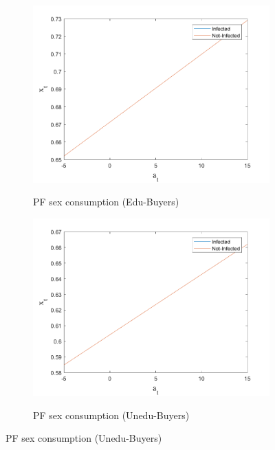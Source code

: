 \begin{figure}[H]\caption{Pre-epidemic stage, continuation}
\begin{subfigure}{0.5\textwidth}\caption{PF sex consumption (Edu-Buyers)}
   \includegraphics[width=\linewidth,height = 0.22\textheight]{figures/pre/FIG9.png}
    \label{fig_dert}
\end{subfigure}
\hspace*{\fill}
\begin{subfigure}{0.5\textwidth}\caption{PF sex consumption (Unedu-Buyers)}
   \includegraphics[width=\linewidth,height = 0.22\textheight]{figures/pre/FIG10.png}
    \label{fig:x_b}
\end{subfigure}

\end{figure}
